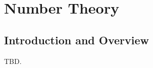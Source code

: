 \chapter{Number Theory}
\label{cnth0}

\section{Introduction and Overview}
\label{cnth0:siov0}

TBD.

